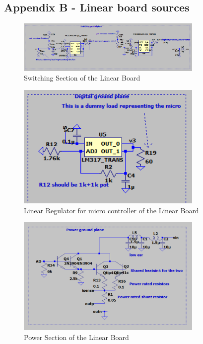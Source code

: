 \documentclass[15pt]{article}
\begin{document}
\subsection{Appendix B - Linear board sources}

\begin{figure}[H]
    \centering
    \includegraphics[width=0.8\textwidth]{chase2}
    \caption{Switching Section of the Linear Board}
    \label{fig:chase2}
\end{figure}


\begin{figure}[H]
    \centering
    \includegraphics[width=0.8\textwidth]{chase3}
    \caption{Linear Regulator for micro controller of the Linear Board}
    \label{fig:chase3}
\end{figure}

\begin{figure}[H]
    \centering
    \includegraphics[width=0.8\textwidth]{chase4}
    \caption{Power Section of the Linear Board}
    \label{fig:chase4}
\end{figure}
\end{document}

